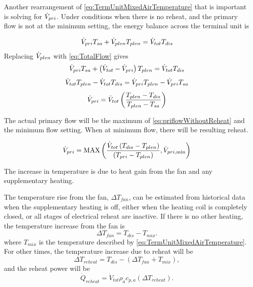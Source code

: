 Another rearrangement of \ref{eq:TermUnitMixedAirTemperature} that is important is
solving for \(\dot{V}_{pri}\). Under conditions when there is no reheat, and the
primary flow is not at the minimum setting, the energy balance across the
terminal unit is

\begin{equation}
    \dot{V}_{pri} T_{sa} + \dot{V}_{plen} T_{plen} = \dot{V}_{tot} T_{dis}
\end{equation}
Replacing \(\dot{V}_{plen}{} \) with  \ref{eq:TotalFlow} gives
\begin{equation}
    \dot{V}_{pri} T_{sa} +  \left(\dot{V}_{tot} - \dot{V}_{pri} \right)  T_{plen} = \dot{V}_{tot} T_{dis}
\end{equation}
\begin{equation}
 \dot{V}_{tot} T_{plen}  -   \dot{V}_{tot} T_{dis}  = \dot{V}_{pri}  T_{plen}  - \dot{V}_{pri} T_{sa}
\end{equation}
\begin{equation}\label{eq:priflowWithoutReheat}
   \dot{V}_{pri} = \dot{V}_{tot} \left( \frac{T_{plen} - T_{dis} }{T_{plen} - T_{sa}} \right)
\end{equation}

The actual primary flow will be the maximum of 
\ref{eq:priflowWithoutReheat} and the minimum flow setting. When at minimum
flow, there will be resulting reheat.


\begin{equation} \label{eq:PrimaryFlowInTerminalUnit}
    \dot{V}_{pri} = \text{MAX}\left(\frac{\dot{V}_{tot} \left(T_{dis} - T_{plen} \right)}{\left(T_{pri} - T_{plen} \right)}, \dot{V}_{pri, \text{min}} \right)
\end{equation}


The increase in temperature is due to heat gain from the fan and
any supplementary heating.

The temperature rise from the fan, \(\Delta T_{fan}\), can be estimated from
historical data when the supplementary heating is off, either when the heating
coil is completely closed, or all stages of electrical reheat are inactive. If
there is no other heating, the temperature increase from the fan is
%
\begin{equation}
\Delta {T_{fan}} = {T_{dis}} - {T_{mix}}.
\end{equation}
where \(T_{mix}\) is the temperature described by 
\ref{eq:TermUnitMixedAirTemperature}.
%
For other times, the temperature increase due to reheat will be
%
\begin{equation}
\Delta {T_{reheat}} = {T_{dis}} - \left( {\Delta {T_{fan}} + {T_{mix}}} \right),
\end{equation}
%
and the reheat power will be
%
\begin{equation}
{\dot Q_{reheat}} = {\dot V_{tot}}{\rho _a}{c_{p,a}}\left( {\Delta {T_{reheat}}} \right).
\end{equation}

